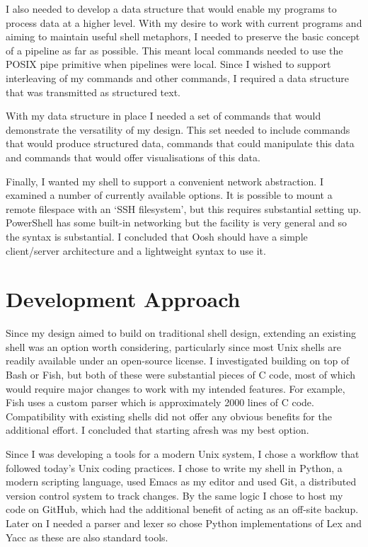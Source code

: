\documentclass[12pt,twoside,notitlepage]{report}
\begin{document}
I also needed to develop a data structure that would enable my
programs to process data at a higher level. With my desire to work
with current programs and aiming to maintain useful shell metaphors, I
needed to preserve the basic concept of a pipeline as far as
possible. This meant local commands needed to use the POSIX pipe
primitive when pipelines were local. Since I wished to support
interleaving of my commands and other commands, I required a data
structure that was transmitted as structured text.

With my data structure in place I needed a set of commands that would
demonstrate the versatility of my design. This set needed to include commands
that would produce structured data, commands that could manipulate this data and
commands that would offer visualisations of this data.

Finally, I wanted my shell to support a convenient network
abstraction. I examined a number of currently available options. It is
possible to mount a remote filespace with an `SSH filesystem', but
this requires substantial setting up. PowerShell has some built-in
networking but the facility is very general and so the syntax is
substantial. I concluded that Oosh should have a simple client/server
architecture and a lightweight syntax to use it.

\section{Development Approach}
Since my design aimed to build on traditional shell design, extending
an existing shell was an option worth considering, particularly since
most Unix shells are readily available under an open-source license. I
investigated building on top of Bash or Fish, but both of these were
substantial pieces of C code, most of which would require major
changes to work with my intended features. For example, Fish uses a
custom parser which is approximately 2000 lines of C code. Compatibility
with existing shells did not offer any obvious benefits for the
additional effort. I concluded that starting afresh was my best
option.

Since I was developing a tools for a modern Unix system, I chose a
workflow that followed today's Unix coding practices. I chose to write
my shell in Python, a modern scripting language, used Emacs as my
editor and used Git, a distributed version control system to track
changes. By the same logic I chose to host my code on GitHub, which
had the additional benefit of acting as an off-site backup. Later on I
needed a parser and lexer so chose Python implementations of Lex and
Yacc as these are also standard tools.
\end{document}
